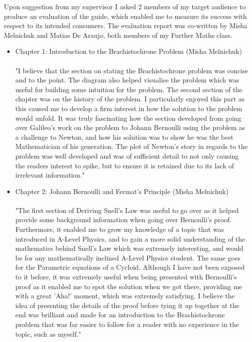 \documentclass[12pt]{report}
\begin{document}
Upon suggestion from my supervisor I asked 2 members of my target audience to produce an evaluation of the guide, which enabled me to measure its success with respect to its intended consumers. The evaluation report was co-written by Misha Melnichuk and Matias De Araujo, both members of my Further Maths class.
\begin{itemize}
    \item Chapter 1: Introduction to the Brachistochrone Problem (Misha Melnichuk)
    \\
    \\
    "I believe that the section on stating the Brachistochrone problem was concise and to the point. The diagram also helped visualise the problem which was useful for building some intuition for the problem. The second section of the chapter was on the history of the problem. I particularly enjoyed this part as this caused me to develop a firm interest in how the solution to the problem would unfold. It was truly fascinating how the section developed from going over Galileo's work on the problem to Johann Bernoulli using the problem as a challenge to Newton, and how his solution was to show he was the best Mathematician of his generation. The plot of Newton's story in regards to the problem was well developed and was of sufficient detail to not only causing the readers interest to spike, but to ensure it is retained due to its lack of irrelevant information."
    \item Chapter 2: Johann Bernoulli and Fermat's Principle (Misha Melnichuk)
    \\
    \\
    "The first section of Deriving Snell's Law was useful to go over as it helped provide some background information when going over Bernoulli's proof. Furthermore, it enabled me to grow my knowledge of a topic that was introduced in A-Level Physics, and to gain a more solid understanding of the mathematics behind Snell's Law which was extremely interesting, and would be for any mathematically inclined A-Level Physics student. The same goes for the Parametric equations of a Cycloid. Although I have not been exposed to it before, it was extremely useful when being presented with Bernoulli's proof as it enabled me to spot the solution when we got there, providing me with a great 'Aha!' moment, which was extremely satisfying. I believe the idea of presenting the details of the proof before tying it up together at the end was brilliant and made for an introduction to the Brachistochrone problem that was far easier to follow for a reader with no experience in the topic, such as myself."

\end{itemize}
\end{document}

